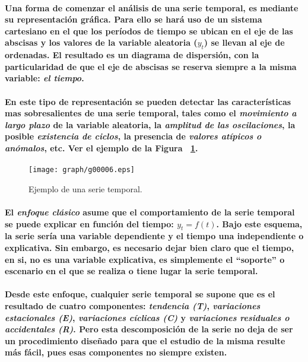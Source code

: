 \paragraph{
Una forma de comenzar el análisis de una serie temporal, es mediante su representación gráfica. Para ello se hará uso de un sistema cartesiano en el que los períodos de tiempo se ubican en el eje de las abscisas y los valores de la variable aleatoria ($y_t$) se llevan al eje de ordenadas. El resultado es un diagrama de dispersión, con la particularidad de que el eje de abscisas se reserva siempre a la misma variable: \emph{el tiempo}.
}
\paragraph{
En este tipo de representación se pueden detectar las características mas sobresalientes de una serie temporal, tales como el \emph{movimiento a largo plazo} de la variable aleatoria, la \emph{amplitud de las oscilaciones}, la posible \emph{existencia de ciclos}, la presencia de \emph{valores atípicos o anómalos}, etc. Ver el ejemplo de la Figura ~\ref{fig:EjemploSerieTemporal}.
}
\begin{figure}[ht]
\centering
\texttt{[image: graph/g00006.eps]}
\caption[Serie Temporal]{Ejemplo de una serie temporal.}
\label{fig:EjemploSerieTemporal}
\end{figure}
\paragraph{
El \emph{enfoque clásico} asume que el comportamiento de la serie temporal se puede explicar en función del tiempo: $y_t=f(t)$. Bajo este esquema, la serie sería una variable dependiente y el tiempo una independiente o explicativa. Sin embargo, es necesario dejar bien claro que el tiempo, en si, no es una variable explicativa, es simplemente el ``soporte'' o escenario en el que se realiza o tiene lugar la serie temporal.
}	
\paragraph{
Desde este enfoque, cualquier serie temporal se supone que es el resultado de cuatro componentes: \emph{tendencia (T)}, \emph{variaciones estacionales (E)}, \emph{variaciones cíclicas (C)} y \emph{variaciones residuales o accidentales (R)}. Pero esta descomposición de la serie no deja de ser un procedimiento diseñado para que el estudio de la misma resulte más fácil, pues esas componentes no siempre existen.
}



